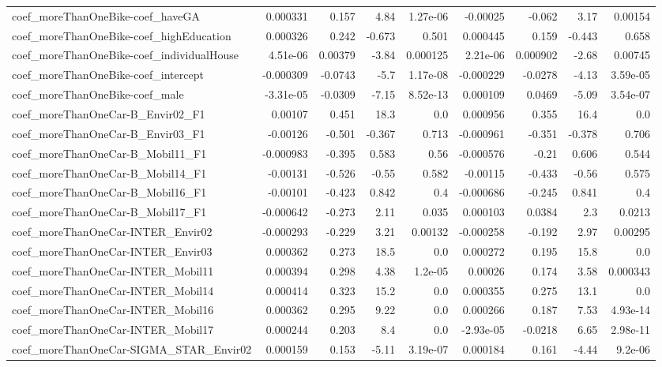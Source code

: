 \begin{tabular}{lrrrrrrrr}
coef_moreThanOneBike-coef_haveGA & 0.000331 & 0.157 & 4.84 & 1.27e-06 & -0.00025 & -0.062 & 3.17 & 0.00154 \\
coef_moreThanOneBike-coef_highEducation & 0.000326 & 0.242 & -0.673 & 0.501 & 0.000445 & 0.159 & -0.443 & 0.658 \\
coef_moreThanOneBike-coef_individualHouse & 4.51e-06 & 0.00379 & -3.84 & 0.000125 & 2.21e-06 & 0.000902 & -2.68 & 0.00745 \\
coef_moreThanOneBike-coef_intercept & -0.000309 & -0.0743 & -5.7 & 1.17e-08 & -0.000229 & -0.0278 & -4.13 & 3.59e-05 \\
coef_moreThanOneBike-coef_male & -3.31e-05 & -0.0309 & -7.15 & 8.52e-13 & 0.000109 & 0.0469 & -5.09 & 3.54e-07 \\
coef_moreThanOneCar-B_Envir02_F1 & 0.00107 & 0.451 & 18.3 & 0.0 & 0.000956 & 0.355 & 16.4 & 0.0 \\
coef_moreThanOneCar-B_Envir03_F1 & -0.00126 & -0.501 & -0.367 & 0.713 & -0.000961 & -0.351 & -0.378 & 0.706 \\
coef_moreThanOneCar-B_Mobil11_F1 & -0.000983 & -0.395 & 0.583 & 0.56 & -0.000576 & -0.21 & 0.606 & 0.544 \\
coef_moreThanOneCar-B_Mobil14_F1 & -0.00131 & -0.526 & -0.55 & 0.582 & -0.00115 & -0.433 & -0.56 & 0.575 \\
coef_moreThanOneCar-B_Mobil16_F1 & -0.00101 & -0.423 & 0.842 & 0.4 & -0.000686 & -0.245 & 0.841 & 0.4 \\
coef_moreThanOneCar-B_Mobil17_F1 & -0.000642 & -0.273 & 2.11 & 0.035 & 0.000103 & 0.0384 & 2.3 & 0.0213 \\
coef_moreThanOneCar-INTER_Envir02 & -0.000293 & -0.229 & 3.21 & 0.00132 & -0.000258 & -0.192 & 2.97 & 0.00295 \\
coef_moreThanOneCar-INTER_Envir03 & 0.000362 & 0.273 & 18.5 & 0.0 & 0.000272 & 0.195 & 15.8 & 0.0 \\
coef_moreThanOneCar-INTER_Mobil11 & 0.000394 & 0.298 & 4.38 & 1.2e-05 & 0.00026 & 0.174 & 3.58 & 0.000343 \\
coef_moreThanOneCar-INTER_Mobil14 & 0.000414 & 0.323 & 15.2 & 0.0 & 0.000355 & 0.275 & 13.1 & 0.0 \\
coef_moreThanOneCar-INTER_Mobil16 & 0.000362 & 0.295 & 9.22 & 0.0 & 0.000266 & 0.187 & 7.53 & 4.93e-14 \\
coef_moreThanOneCar-INTER_Mobil17 & 0.000244 & 0.203 & 8.4 & 0.0 & -2.93e-05 & -0.0218 & 6.65 & 2.98e-11 \\
coef_moreThanOneCar-SIGMA_STAR_Envir02 & 0.000159 & 0.153 & -5.11 & 3.19e-07 & 0.000184 & 0.161 & -4.44 & 9.2e-06 \\

\end{tabular}
